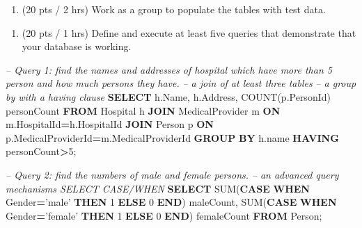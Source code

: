 \documentclass[
]{article}
\newenvironment{Shaded}{\begin{snugshade}}{\end{snugshade}}
\newcommand{\CommentTok}[1]{\textcolor[rgb]{0.56,0.35,0.01}{\textit{#1}}}
\newcommand{\ControlFlowTok}[1]{\textcolor[rgb]{0.13,0.29,0.53}{\textbf{#1}}}
\newcommand{\DecValTok}[1]{\textcolor[rgb]{0.00,0.00,0.81}{#1}}
\newcommand{\FunctionTok}[1]{\textcolor[rgb]{0.00,0.00,0.00}{#1}}
\newcommand{\KeywordTok}[1]{\textcolor[rgb]{0.13,0.29,0.53}{\textbf{#1}}}
\newcommand{\NormalTok}[1]{#1}
\newcommand{\OperatorTok}[1]{\textcolor[rgb]{0.81,0.36,0.00}{\textbf{#1}}}
\newcommand{\StringTok}[1]{\textcolor[rgb]{0.31,0.60,0.02}{#1}}
\providecommand{\tightlist}{%
  \setlength{\itemsep}{0pt}\setlength{\parskip}{0pt}}
\begin{document}
\begin{enumerate}
\def\labelenumi{\arabic{enumi}.}
\setcounter{enumi}{5}
\tightlist
\item
  (20 pts / 2 hrs) Work as a group to populate the tables with test
  data.
\end{enumerate}

\begin{enumerate}
\def\labelenumi{\arabic{enumi}.}
\setcounter{enumi}{6}
\tightlist
\item
  (20 pts / 1 hrs) Define and execute at least five queries that
  demonstrate that your database is working.
\end{enumerate}

\begin{Shaded}
\begin{Highlighting}[]
\CommentTok{-- Query 1: find the names and addresses of hospital which have more than 5 person and how much persons they have.}
\CommentTok{-- a join of at least three tables}
\CommentTok{-- a group by with a having clause}
\KeywordTok{SELECT}
\NormalTok{  h.Name,}
\NormalTok{  h.Address,}
  \FunctionTok{COUNT}\NormalTok{(p.PersonId) personCount}
\KeywordTok{FROM}\NormalTok{ Hospital h}
\KeywordTok{JOIN}\NormalTok{ MedicalProvider m}
\KeywordTok{ON}\NormalTok{ m.HospitalId}\OperatorTok{=}\NormalTok{h.HospitalId}
\KeywordTok{JOIN}\NormalTok{ Person p}
\KeywordTok{ON}\NormalTok{ p.MedicalProviderId}\OperatorTok{=}\NormalTok{m.MedicalProviderId}
\KeywordTok{GROUP} \KeywordTok{BY}\NormalTok{ h.name}
\KeywordTok{HAVING}\NormalTok{ personCount}\OperatorTok{>}\DecValTok{5}\NormalTok{;}




\CommentTok{-- Query 2: find the numbers of male and female persons.}
\CommentTok{-- an advanced query mechanisms SELECT CASE/WHEN}
\KeywordTok{SELECT}
  \FunctionTok{SUM}\NormalTok{(}\ControlFlowTok{CASE} \ControlFlowTok{WHEN}\NormalTok{ Gender}\OperatorTok{=}\StringTok{'male'} \ControlFlowTok{THEN} \DecValTok{1} \ControlFlowTok{ELSE} \DecValTok{0} \ControlFlowTok{END}\NormalTok{) maleCount,}
  \FunctionTok{SUM}\NormalTok{(}\ControlFlowTok{CASE} \ControlFlowTok{WHEN}\NormalTok{ Gender}\OperatorTok{=}\StringTok{'female'} \ControlFlowTok{THEN} \DecValTok{1} \ControlFlowTok{ELSE} \DecValTok{0} \ControlFlowTok{END}\NormalTok{) femaleCount}
\KeywordTok{FROM}\NormalTok{ Person;}




\end{Highlighting}
\end{Shaded}
\end{document}

